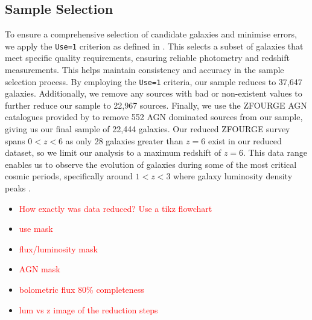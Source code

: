 \subsection{Sample Selection}
To ensure a comprehensive selection of candidate galaxies and minimise errors, we apply the \texttt{Use=1} criterion as defined in \cite{straatman_fourstar_2016}. This selects a subset of galaxies that meet specific quality requirements, ensuring reliable photometry and redshift measurements. This helps maintain consistency and accuracy in the sample selection process. By employing the \texttt{Use=1} criteria, our sample reduces to 37,647 galaxies. Additionally, we remove any sources with bad or non-existent values to further reduce our sample to 22,967 sources. Finally, we use the ZFOURGE AGN catalogues provided by \cite{cowley_zfourge_2016} to remove 552 AGN dominated sources from our sample, giving us our final sample of 22,444 galaxies. Our reduced ZFOURGE survey spans $0<z<6$ as only 28 galaxies greater than $z=6$ exist in our reduced dataset, so we limit our analysis to a maximum redshift of $z=6$. This data range enables us to observe the evolution of galaxies during some of the most critical cosmic periods, specifically around $1 < z < 3$ \citep{gruppioni_modelling_2011, wylezalek_galaxy_2014} where galaxy luminosity density peaks \citep{assef_mid-ir-_2011}. 

\begin{itemize}
    \item \textcolor{red}{How exactly was data reduced? Use a tikz flowchart}
    \item \textcolor{red}{use mask}
    \item \textcolor{red}{flux/luminosity mask}
    \item \textcolor{red}{AGN mask}
    \item \textcolor{red}{bolometric flux 80\% completeness}
    \item \textcolor{red}{lum vs z image of the reduction steps}
\end{itemize}